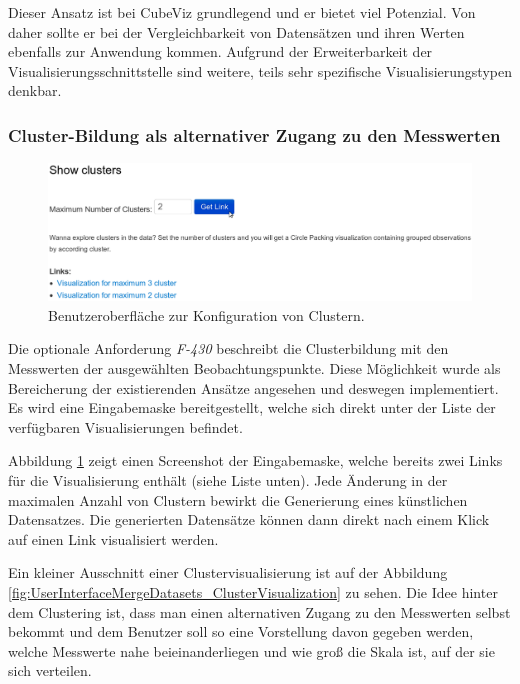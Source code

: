 \documentclass[11pt]{article}
\newcommand{\com}[1]{\marginpar{\em {\small{#1}}}} %
\begin{document}
Dieser Ansatz ist bei CubeViz grundlegend und er bietet viel Potenzial. Von daher sollte er bei der Vergleichbarkeit von Datensätzen und ihren Werten ebenfalls zur Anwendung kommen. Aufgrund der Erweiterbarkeit der Visualisierungsschnittstelle sind weitere, teils sehr spezifische Visualisierungstypen denkbar.


%
%
\subsubsection{Cluster-Bildung als alternativer Zugang zu den Messwerten \\}

%
%
\begin{figure}[h!]
    \centering
    \includegraphics[width=15cm]{UserInterfaceMergeDatasets/ClusterUserInterface.pdf}
    \caption{Benutzeroberfläche zur Konfiguration von Clustern.}
    \label{fig:UserInterfaceMergeDatasets_ClusterUserInterface}
\end{figure}

Die optionale Anforderung \textit{F-430}\com{Anforderung \\ F-430, S. \pageref{req:F430}} beschreibt die Clusterbildung mit den Messwerten der ausgewählten Beobachtungspunkte. Diese Möglichkeit wurde als Bereicherung der existierenden Ansätze angesehen und deswegen implementiert. Es wird eine Eingabemaske bereitgestellt, welche sich direkt unter der Liste der verfügbaren Visualisierungen befindet. 

\newpage
\noindent
Abbildung \ref{fig:UserInterfaceMergeDatasets_ClusterUserInterface} zeigt einen Screenshot der Eingabemaske, welche bereits zwei Links für die Visualisierung enthält (siehe Liste unten). Jede Änderung in der maximalen Anzahl von Clustern bewirkt die Generierung eines künstlichen Datensatzes. Die generierten Datensätze können dann direkt nach einem Klick auf einen Link visualisiert werden. 

Ein kleiner Ausschnitt einer Clustervisualisierung ist auf der Abbildung \ref{fig:UserInterfaceMergeDatasets_ClusterVisualization} zu sehen. Die Idee hinter dem Clustering ist, dass man einen alternativen Zugang zu den Messwerten selbst bekommt und dem Benutzer soll so eine Vorstellung davon gegeben werden, welche Messwerte nahe beieinanderliegen und wie groß die Skala ist, auf der sie sich verteilen. \\
\end{document}

